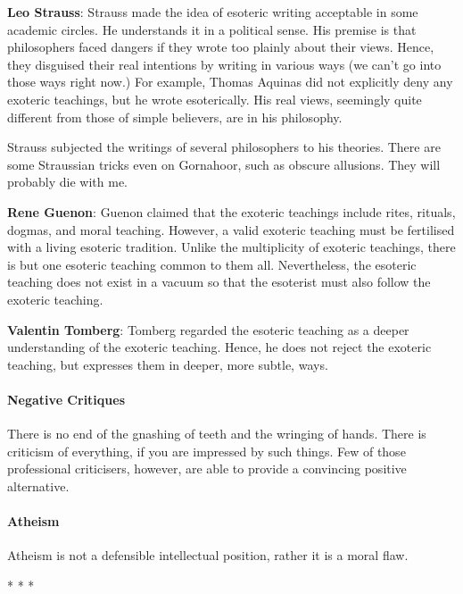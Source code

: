 \textbf{Leo Strauss}: Strauss made the idea of esoteric writing acceptable in some academic circles. He understands it in a political sense. His premise is that philosophers faced dangers if they wrote too plainly about their views. Hence, they disguised their real intentions by writing in various ways (we can't go into those ways right now.) For example, Thomas Aquinas did not explicitly deny any exoteric teachings, but he wrote esoterically. His real views, seemingly quite different from those of simple believers, are in his philosophy.

Strauss subjected the writings of several philosophers to his theories. There are some Straussian tricks even on Gornahoor, such as obscure allusions. They will probably die with me.

\textbf{Rene Guenon}: Guenon claimed that the exoteric teachings include rites, rituals, dogmas, and moral teaching. However, a valid exoteric teaching must be fertilised with a living esoteric tradition. Unlike the multiplicity of exoteric teachings, there is but one esoteric teaching common to them all. Nevertheless, the esoteric teaching does not exist in a vacuum so that the esoterist must also follow the exoteric teaching.

\textbf{Valentin Tomberg}: Tomberg regarded the esoteric teaching as a deeper understanding of the exoteric teaching. Hence, he does not reject the exoteric teaching, but expresses them in deeper, more subtle, ways.

\paragraph{Negative Critiques}
There is no end of the gnashing of teeth and the wringing of hands. There is criticism of everything, if you are impressed by such things. Few of those professional criticisers, however, are able to provide a convincing positive alternative.

\paragraph{Atheism}
Atheism is not a defensible intellectual position, rather it is a moral flaw.




\begin{center}* * *\end{center}

